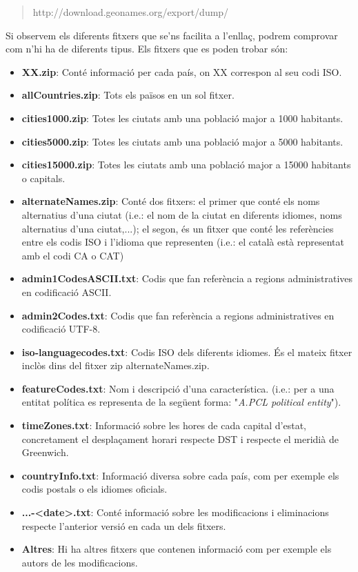 \documentclass[12pt,a4paper,openright,oneside]{article}
\numberwithin{equation}{section}
\theoremstyle{definition}
\begin{document}
\begin{quote}
http://download.geonames.org/export/dump/
\end{quote}
Si observem els diferents fitxers que se'ns facilita a l'enllaç, podrem comprovar com n'hi ha de diferents tipus. Els fitxers que es poden trobar són:
\begin{itemize}
\item \textbf{XX.zip}: Conté informació per cada país, on XX correspon al seu codi ISO.
\item \textbf{allCountries.zip}: Tots els països en un sol fitxer.
\item \textbf{cities1000.zip}: Totes les ciutats amb una població major a 1000 habitants.
\item \textbf{cities5000.zip}: Totes les ciutats amb una població major a 5000 habitants.
\item \textbf{cities15000.zip}: Totes les ciutats amb una població major a 15000 habitants o capitals.
\item \textbf{alternateNames.zip}: Conté dos fitxers: el primer que conté els noms alternatius d'una ciutat (i.e.: el nom de la ciutat en diferents idiomes, noms alternatius d'una ciutat,...); el segon, és un fitxer que conté les referències entre els codis ISO i l'idioma que representen (i.e.: el català està representat amb el codi CA o CAT)
\item \textbf{admin1CodesASCII.txt}: Codis que fan referència a regions administratives en codificació ASCII.
\item \textbf{admin2Codes.txt}: Codis que fan referència a regions administratives en codificació UTF-8.
\item \textbf{iso-languagecodes.txt}: Codis ISO dels diferents idiomes. És el mateix fitxer inclòs dins del fitxer zip alternateNames.zip.
\item \textbf{featureCodes.txt}: Nom i descripció d'una característica. (i.e.: per a una entitat política es representa de la següent forma: "\emph{A.PCL	political entity}").
\item \textbf{timeZones.txt}: Informació sobre les hores de cada capital d'estat, concretament el desplaçament horari respecte DST i respecte el meridià de Greenwich.
\item \textbf{countryInfo.txt}: Informació diversa sobre cada país, com per exemple els codis postals o els idiomes oficials.
\item \textbf{...-<date>.txt}: Conté informació sobre les modificacions i eliminacions respecte l'anterior versió en cada un dels fitxers.
\item \textbf{Altres}: Hi ha altres fitxers que contenen informació com per exemple els autors de les modificacions.
\end{itemize}
\end{document}
